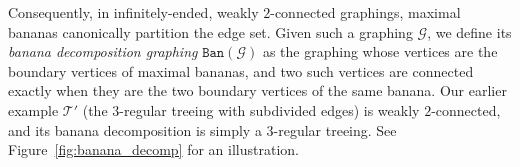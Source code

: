 \documentclass{article}
\theoremstyle{plain}
\theoremstyle{definition}
\newcommand{\R}{\mathbb{R}}
\newcommand{\cG}{\mathcal{G}}
\newcommand{\cT}{\mathcal{T}}
\begin{document}
Consequently, in infinitely-ended, weakly $2$-connected graphings, maximal bananas canonically partition the edge set. Given such a graphing $\cG$, we define its \emph{banana decomposition graphing} $\texttt{Ban}(\cG)$ as the graphing whose vertices are the boundary vertices of maximal bananas, and two such vertices are connected exactly when they are the two boundary vertices of the same banana. Our earlier example $\cT'$ (the $3$-regular treeing with subdivided edges) is weakly $2$-connected, and its banana decomposition is simply a $3$-regular treeing. See Figure~\ref{fig:banana_decomp} for an illustration. 


\begin{figure}[htb]
\begin{center}

\end{center}
\end{figure}
\end{document}
